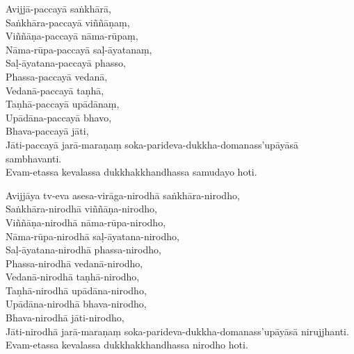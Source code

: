 Avijjā-paccayā saṅkhārā,\\
Saṅkhāra-paccayā viññāṇaṃ,\\
Viññāṇa-paccayā nāma-rūpaṃ,\\
Nāma-rūpa-paccayā saḷ-āyatanaṃ,\\
Saḷ-āyatana-paccayā phasso,\\
Phassa-paccayā vedanā,\\
Vedanā-paccayā taṇhā,\\
Taṇhā-paccayā upādānaṃ,\\
Upādāna-paccayā bhavo,\\
Bhava-paccayā jāti,\\
Jāti-paccayā jarā-maraṇaṃ soka-parideva-dukkha-domanass'upāyāsā sambhavanti.\\
Evam-etassa kevalassa dukkhakkhandhassa samudayo hoti.

Avijjāya tv-eva asesa-virāga-nirodhā saṅkhāra-nirodho,\\
Saṅkhāra-nirodhā viññāṇa-nirodho,\\
Viññāṇa-nirodhā nāma-rūpa-nirodho,\\
Nāma-rūpa-nirodhā saḷ-āyatana-nirodho,\\
Saḷ-āyatana-nirodhā phassa-nirodho,\\
Phassa-nirodhā vedanā-nirodho,\\
Vedanā-nirodhā taṇhā-nirodho,\\
Taṇhā-nirodhā upādāna-nirodho,\\
Upādāna-nirodhā bhava-nirodho,\\
Bhava-nirodhā jāti-nirodho,\\
Jāti-nirodhā jarā-maraṇaṃ soka-parideva-dukkha-domanass'upāyāsā nirujjhanti.\\
Evam-etassa kevalassa dukkhakkhandhassa nirodho hoti.


